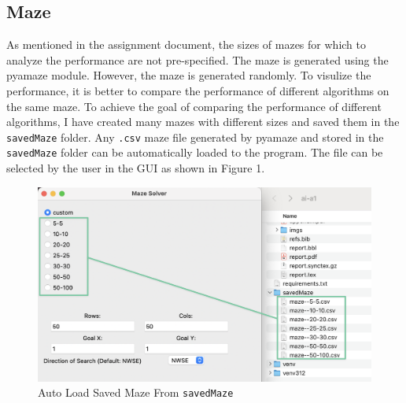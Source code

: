 \documentclass{article}
\begin{document}
\subsection{Maze}
As mentioned in the assignment document, the sizes of mazes for which to analyze the performance are not pre-specified. 
The maze is generated using the pyamaze module. However, the maze is generated randomly. To visulize the performance, it is better to compare the performance of different algorithms on the same maze. 
To achieve the goal of comparing the performance of different algorithms, I have created many mazes with different sizes and saved them in the \texttt{savedMaze} folder. 
Any \texttt{.csv} maze file generated by pyamaze and stored in the \texttt{savedMaze} folder can be automatically loaded to the program. The file can be selected by the user in the GUI as shown in Figure 1.
\begin{figure}[h]
    \centering
    \includegraphics[scale=0.148]{imgs/auto_load.eps}
    \caption{Auto Load Saved Maze From \texttt{savedMaze}}
    \label{figure}
\end{figure}
\end{document}
